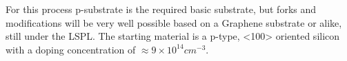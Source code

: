 For this process p-substrate is the required basic substrate, but forks and modifications will be very well possible based on a Graphene substrate or alike, still under the LSPL.
The starting material is a p-type, <100> oriented silicon with a doping concentration of $\approx 9\times10^{14}cm^{-3}$.\\



